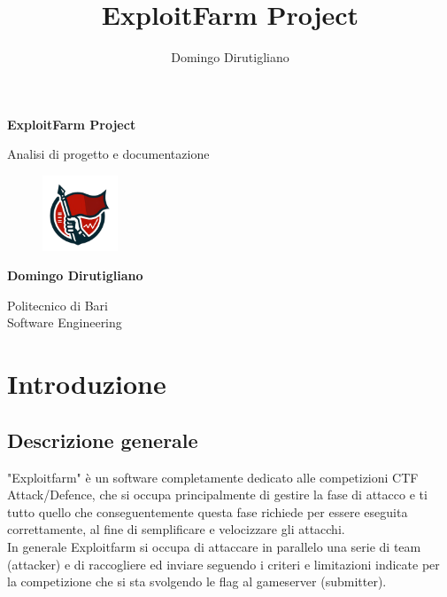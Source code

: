 \documentclass[11pt]{article}
\title{ExploitFarm Project}
\author{Domingo Dirutigliano}
\begin{document}
\begin{titlepage}
   \begin{center}
       \vspace*{1cm}

       \LARGE{\textbf{ExploitFarm Project}}

       \vspace{0.5cm}
        Analisi di progetto e documentazione
       
       \vspace{0.5cm}
       
       \begin{figure}[h]
    		\centering
    		\includegraphics[width=0.2\textwidth]{logo.png}
		\end{figure}
       
       \vspace{0.5cm}

       \textbf{Domingo Dirutigliano}

       \vfill
            
       Politecnico di Bari\\
       Software Engineering
            
       \vspace{0.1cm}
   \end{center}
\end{titlepage}

\tableofcontents
\newpage

\section{Introduzione}
\subsection{Descrizione generale}
	"Exploitfarm" è un software completamente dedicato alle competizioni CTF Attack/Defence, che si occupa principalmente di gestire la fase di attacco e ti tutto quello che conseguentemente questa fase richiede per essere eseguita correttamente, al fine di semplificare e velocizzare gli attacchi.\\
	In generale Exploitfarm si occupa di attaccare in parallelo una serie di team (attacker) e di raccogliere ed inviare seguendo i criteri e limitazioni indicate per la competizione che si sta svolgendo le flag al gameserver (submitter).
\end{document}
